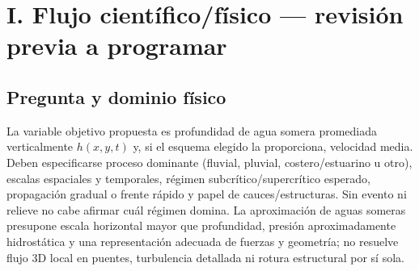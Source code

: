 \documentclass[11pt,a4paper]{article}
\begin{document}
\section{I. Flujo científico/físico --- revisión previa a programar}
\subsection{Pregunta y dominio físico}
\begin{center}
\end{center}
La variable objetivo propuesta es profundidad de agua somera promediada verticalmente $h(x,y,t)$ y, si el esquema elegido la proporciona, velocidad media. Deben especificarse proceso dominante (fluvial, pluvial, costero/estuarino u otro), escalas espaciales y temporales, régimen subcrítico/supercrítico esperado, propagación gradual o frente rápido y papel de cauces/estructuras. Sin evento ni relieve no cabe afirmar cuál régimen domina. La aproximación de aguas someras presupone escala horizontal mayor que profundidad, presión aproximadamente hidrostática y una representación adecuada de fuerzas y geometría; no resuelve flujo 3D local en puentes, turbulencia detallada ni rotura estructural por sí sola.
\end{document}
